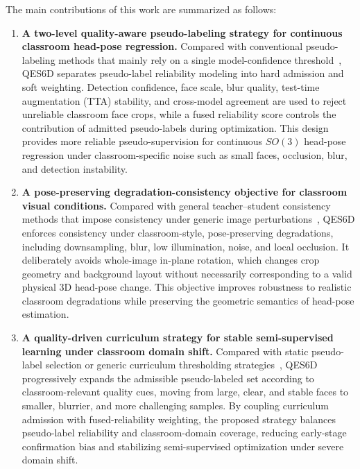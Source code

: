 \documentclass[preprint,12pt]{elsarticle}
\begin{document}
The main contributions of this work are summarized as follows:
\begin{enumerate}
 \item \textbf{A two-level quality-aware pseudo-labeling strategy for continuous classroom head-pose regression.}
 Compared with conventional pseudo-labeling methods that mainly rely on a single model-confidence threshold~\cite{lee2013pseudo,sohn2020fixmatch,softmatch2023,freematch2023}, QES6D separates pseudo-label reliability modeling into hard admission and soft weighting. Detection confidence, face scale, blur quality, test-time augmentation (TTA) stability, and cross-model agreement are used to reject unreliable classroom face crops, while a fused reliability score controls the contribution of admitted pseudo-labels during optimization. This design provides more reliable pseudo-supervision for continuous $SO(3)$ head-pose regression under classroom-specific noise such as small faces, occlusion, blur, and detection instability.

 \item \textbf{A pose-preserving degradation-consistency objective for classroom visual conditions.}
 Compared with general teacher--student consistency methods that impose consistency under generic image perturbations~\cite{tarvainen2017mean,xie2020uda,berthelot2020remixmatch,flexmatch2021}, QES6D enforces consistency under classroom-style, pose-preserving degradations, including downsampling, blur, low illumination, noise, and local occlusion. It deliberately avoids whole-image in-plane rotation, which changes crop geometry and background layout without necessarily corresponding to a valid physical 3D head-pose change. This objective improves robustness to realistic classroom degradations while preserving the geometric semantics of head-pose estimation.

 \item \textbf{A quality-driven curriculum strategy for stable semi-supervised learning under classroom domain shift.}
 Compared with static pseudo-label selection or generic curriculum thresholding strategies~\cite{flexmatch2021,metathreshold2024,semireward2024}, QES6D progressively expands the admissible pseudo-labeled set according to classroom-relevant quality cues, moving from large, clear, and stable faces to smaller, blurrier, and more challenging samples. By coupling curriculum admission with fused-reliability weighting, the proposed strategy balances pseudo-label reliability and classroom-domain coverage, reducing early-stage confirmation bias and stabilizing semi-supervised optimization under severe domain shift.
\end{enumerate}
\end{document}
